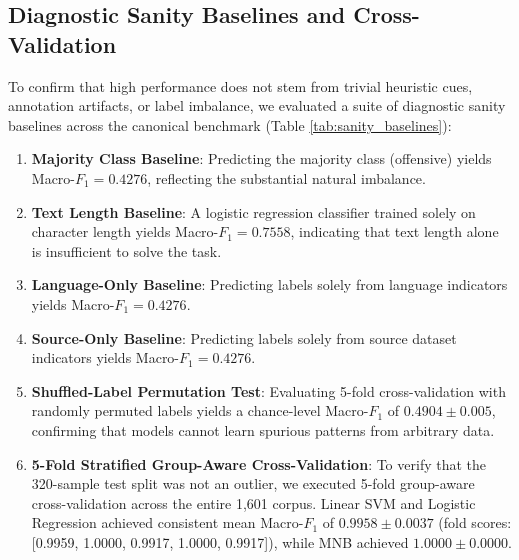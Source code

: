 \documentclass[11pt,a4paper]{article}
\begin{document}
\subsection{Diagnostic Sanity Baselines and Cross-Validation}\label{sec:sanity}
To confirm that high performance does not stem from trivial heuristic cues, annotation artifacts, or label imbalance, we evaluated a suite of diagnostic sanity baselines across the canonical benchmark (Table \ref{tab:sanity_baselines}):
\begin{enumerate}
    \item \textbf{Majority Class Baseline}: Predicting the majority class (offensive) yields Macro-$F_1 = 0.4276$, reflecting the substantial natural imbalance.
    \item \textbf{Text Length Baseline}: A logistic regression classifier trained solely on character length yields Macro-$F_1 = 0.7558$, indicating that text length alone is insufficient to solve the task.
    \item \textbf{Language-Only Baseline}: Predicting labels solely from language indicators yields Macro-$F_1 = 0.4276$.
    \item \textbf{Source-Only Baseline}: Predicting labels solely from source dataset indicators yields Macro-$F_1 = 0.4276$.
    \item \textbf{Shuffled-Label Permutation Test}: Evaluating 5-fold cross-validation with randomly permuted labels yields a chance-level Macro-$F_1$ of $0.4904 \pm 0.005$, confirming that models cannot learn spurious patterns from arbitrary data.
    \item \textbf{5-Fold Stratified Group-Aware Cross-Validation}: To verify that the 320-sample test split was not an outlier, we executed 5-fold group-aware cross-validation across the entire 1,601 corpus. Linear SVM and Logistic Regression achieved consistent mean Macro-$F_1$ of $0.9958 \pm 0.0037$ (fold scores: [0.9959, 1.0000, 0.9917, 1.0000, 0.9917]), while MNB achieved $1.0000 \pm 0.0000$.
\end{enumerate}
\end{document}
